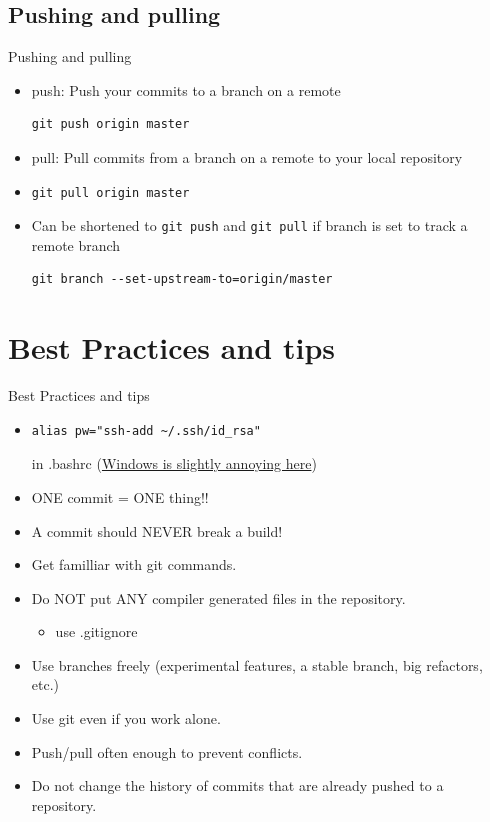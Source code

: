\documentclass[10pt,a4paper]{beamer}
\begin{document}
\subsection{Pushing and pulling}
\begin{frame}[fragile]{Pushing and pulling}
\begin{itemize}
\item push: Push your commits to a branch on a remote
\begin{verbatim}git push origin master\end{verbatim}
\item pull: Pull commits from a branch on a remote to your local repository
\item \begin{verbatim}git pull origin master\end{verbatim}
\item Can be shortened to \texttt{git push} and \texttt{git pull} if branch is set to track a remote branch
\begin{verbatim}git branch --set-upstream-to=origin/master\end{verbatim}
\end{itemize}
\end{frame}


\section{Best Practices and tips}
\begin{frame}[fragile]{Best Practices and tips}
\pause
\begin{itemize}
\item \begin{verbatim}alias pw="ssh-add ~/.ssh/id_rsa"\end{verbatim}
in .bashrc (\href{https://help.github.com/articles/working-with-ssh-key-passphrases}{\color{blue}Windows is slightly annoying here})
\pause
\item ONE commit = ONE thing!!
\pause
\item A commit should NEVER break a build!
\pause
\item Get familliar with git commands.
\pause
\item Do NOT put ANY compiler generated files in the repository.
\begin{itemize}
\item{use .gitignore}
\end{itemize}
\pause
\item Use branches freely (experimental features, a stable branch, big refactors, etc.)
\pause
\item Use git even if you work alone.
\pause
\item Push/pull often enough to prevent conflicts.
\pause
\item Do not change the history of commits that are already pushed to a repository.
\end{itemize}
\end{frame}
\end{document}
